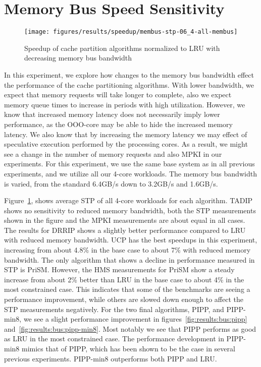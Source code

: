 \section{Memory Bus Speed Sensitivity}
\label{sec:results:bus_sensitivity}


\begin{figure}[t]
    \centering
    \texttt{[image: figures/results/speedup/membus-stp-06\_4-all-membus]}
    \caption{Speedup of cache partition algorithms normalized to LRU with decreasing memory bus bandwidth}
    \label{fig:results:bus}
\end{figure}

In this experiment, we explore how changes to the memory bus bandwidth effect the performance of the cache partitioning algorithms.
With lower bandwidth, we expect that memory requests will take longer to complete, also we expect memory queue times to increase in periods with high utilization.
However, we know that increased memory latency does not necessarily imply lower performance, as the OOO-core may be able to hide the increased memory latency.
We also know that by increasing the memory latency we may effect of speculative execution performed by the processing cores.
As a result, we might see a change in the number of memory requests and also MPKI in our experiments.
For this experiment, we use the same base system as in all previous experiments, and we utilize all our 4-core workloads.
The memory bus bandwidth is varied, from the standard 6.4GB/s down to 3.2GB/s and 1.6GB/s.

Figure~\ref{fig:results:bus}, shows average STP of all 4-core workloads for each algorithm.
TADIP shows no sensitivity to reduced memory bandwidth, both the STP measurements shown in the figure and the MPKI measurements are about equal in all cases.
The results for DRRIP shows a slightly better performance compared to LRU with reduced memory bandwidth.
UCP has the best speedups in this experiment, increasing from about 4.8\% in the base case to about 7\% with reduced memory bandwidth.
The only algorithm that shows a decline in performance measured in STP is PriSM.
However, the HMS measurements for PriSM show a steady increase from about 2\% better than LRU in the base case to about 4\% in the most constrained case.
This indicates that some of the benchmarks are seeing a performance improvement, while others are slowed down enough to affect the STP measurements negatively.
For the two final algorithms, PIPP, and PIPP-min8, we see a slight performance improvement in figures~\ref{fig:results:bus:pipp} and~\ref{fig:results:bus:pipp-min8}. 
Most notably we see that PIPP performs as good as LRU in the most constrained case.
The performance development in PIPP-min8 mimics that of PIPP, which has been shown to be the case in several previous experiments.
PIPP-min8 outperforms both PIPP and LRU.

